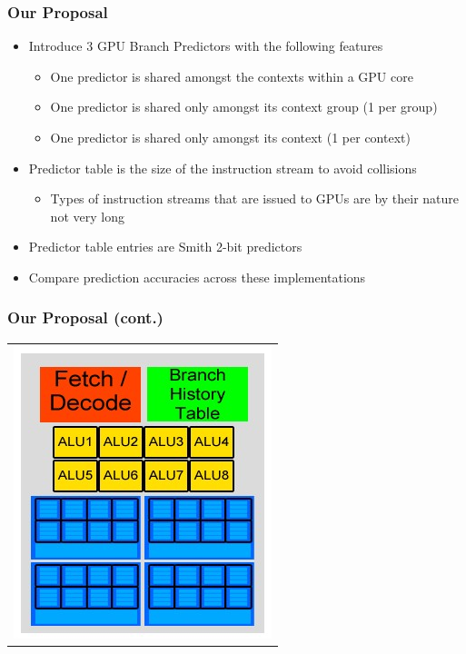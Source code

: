 \documentclass{beamer}
\begin{document}
\begin{frame}
	\frametitle{Our Proposal}
	\begin{itemize}
		\item Introduce 3 GPU Branch Predictors with the following features
		\begin{itemize}
			\item One predictor is shared amongst the contexts within a GPU core
			\item One predictor is shared only amongst its context group (1 per group)
			\item One predictor is shared only amongst its context (1 per context)
		\end{itemize}
		\item Predictor table is the size of the instruction stream to avoid collisions
		\begin{itemize}
			\item Types of instruction streams that are issued to GPUs are by their nature not very long
		\end{itemize}
		\item Predictor table entries are Smith 2-bit predictors
		\item Compare prediction accuracies across these implementations
	\end{itemize}
\end{frame}

\begin{frame}
	\frametitle{Our Proposal (cont.)}
	\begin{tabular}{c}
		\includegraphics[width=.5\textwidth]{Our-GPU---per-core-predictor.jpg}
	\end{tabular}
\end{frame}
\end{document}
